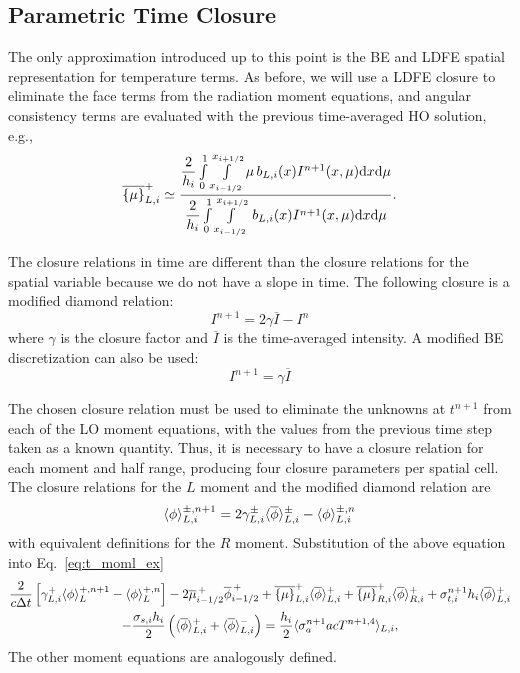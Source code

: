 \subsection{Parametric Time Closure}
%
The only approximation
introduced up to this point is the BE and LDFE spatial representation for temperature
terms.  As before, we
will use a LDFE closure to eliminate the face terms from the radiation moment equations,
and angular consistency terms are evaluated with the previous time-averaged HO solution,
e.g.,
\begin{equation}
    \overline{\left\{ {\mu} \right\}}_{L,i}^{+} \simeq  \frac{
{\displaystyle \frac{2}{h_i}} \int\limits_0^1 \int\limits_{{x_{i-1/2}}}^{{x_{i+1/2}}} \mu \, b_{L,i}(x)
I^{n+1}(x,\mu) \mathrm{d} x \mathrm{d} \mu } 
{{\displaystyle \frac{2}{h_i}} \int\limits_0^1 \int\limits_{{x_{i-1/2}}}^{{x_{i+1/2}}} \, b_{L,i}(x)
I^{n+1}(x,\mu) \mathrm{d} x \mathrm{d} \mu } .
\end{equation}

The closure relations in time are different than the closure relations for the spatial
variable because we do not have a slope in time.  The following closure is a modified diamond
relation:
\begin{equation}\label{eq:tc_diam}
    I^{n+1} = 2\gamma \overline{I} - I^{n}
\end{equation}
where $\gamma$ is the closure factor and $\overline{I}$ is the time-averaged
intensity.  A modified BE discretization can also be used:
\begin{equation}\label{eq:tc_avg}
    I^{n+1} = \gamma \overline{I}
\end{equation}

The chosen closure relation must be used to eliminate the unknowns at $t^{n+1}$ from each
of the LO moment equations, with the values from the previous time step taken as a known quantity.  Thus, it is necessary to have a closure relation for each moment and half
range, producing four closure parameters per spatial cell.  The closure relations for the
$L$ moment and the modified diamond relation are
\begin{equation}\label{eq:tc_diam_l}
    \langle \phi \rangle_{L,i}^{\pm,n+1} = 2 \gamma_{L,i}^{\pm}\langle \overline\phi \rangle_{L,i}^{\pm} -
    \langle \phi \rangle_{L,i}^{\pm,n}
\end{equation}
with equivalent definitions for the $R$ moment.  Substitution of the above equation into
Eq.~\eqref{eq:t_moml_ex}
\begin{multline}
    \frac{2}{c\Delta t}\left[ \gamma_{L,i}^{+} \langle \phi \rangle_L^{+,n+1} - \langle \phi \rangle_L^{+,n} \right]
    -2\overline {\mu}_{i-1/2}^{\,+} \overline \phi_{i-1/2}^{\,+} + \overline{\left\{ \mu \right\}}_{L,i}^{+}
  \langle \overline{\phi} \rangle_{L,i}^{+}
  +  \overline{\left\{ \mu \right\}}_{R,i}^{+}
  \langle \overline{\phi} \rangle_{R,i}^{+} +  \sigma_{t,i}^{n+1} h_i 
  \langle \overline\phi \rangle_{L,i}^{+} \\-  \frac{\sigma_{s,i} h_i}{2} \left( \langle \overline{\phi} \rangle_{L,i}^{+} +
  \langle \overline{\phi} \rangle_{L,i}^{-}\right) = \frac{h_i}{2} \langle \sigma_a^{n+1} a c T^{n+1,4} \rangle_{L,i},
\end{multline}
The other moment equations are analogously defined.  


